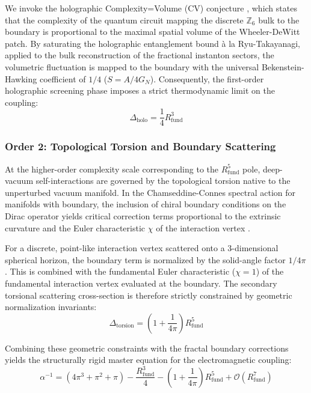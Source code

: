 \documentclass[12pt,a4paper]{article}
\begin{document}
We invoke the holographic Complexity=Volume (CV) conjecture \cite{susskind2016, ageev2018}, which states that the complexity of the quantum circuit mapping the discrete $\mathbb{Z}_6$ bulk to the boundary is proportional to the maximal spatial volume of the Wheeler-DeWitt patch. By saturating the holographic entanglement bound \`a la Ryu-Takayanagi, applied to the bulk reconstruction of the fractional instanton sectors, the volumetric fluctuation is mapped to the boundary with the universal Bekenstein-Hawking coefficient of $1/4$ ($S = A/4G_N$). Consequently, the first-order holographic screening phase imposes a strict thermodynamic limit on the coupling:
\begin{equation}
\Delta_{\text{holo}} = \frac{1}{4} R_{\text{fund}}^3
\end{equation}

\subsubsection{Order 2: Topological Torsion and Boundary Scattering}
At the higher-order complexity scale corresponding to the $R_{\text{fund}}^5$ pole, deep-vacuum self-interactions are governed by the topological torsion native to the unperturbed vacuum manifold. In the Chamseddine-Connes spectral action for manifolds with boundary, the inclusion of chiral boundary conditions on the Dirac operator yields critical correction terms proportional to the extrinsic curvature and the Euler characteristic $\chi$ of the interaction vertex \cite{chamseddine2007, wang2014}.

For a discrete, point-like interaction vertex scattered onto a 3-dimensional spherical horizon, the boundary term is normalized by the solid-angle factor $1/4\pi$. This is combined with the fundamental Euler characteristic ($\chi = 1$) of the fundamental interaction vertex evaluated at the boundary. The secondary torsional scattering cross-section is therefore strictly constrained by geometric normalization invariants:
\begin{equation}
\Delta_{\text{torsion}} = \left(1 + \frac{1}{4\pi}\right) R_{\text{fund}}^5
\end{equation}

Combining these geometric constraints with the fractal boundary corrections yields the structurally rigid master equation for the electromagnetic coupling:
\begin{equation}
\boxed{
\alpha^{-1} = (4\pi^3 + \pi^2 + \pi) - \frac{R_{\text{fund}}^3}{4} - \left(1 + \frac{1}{4\pi}\right)R_{\text{fund}}^5 + \mathcal{O}(R_{\text{fund}}^7)
}
\label{eq:master}
\end{equation}
\end{document}

